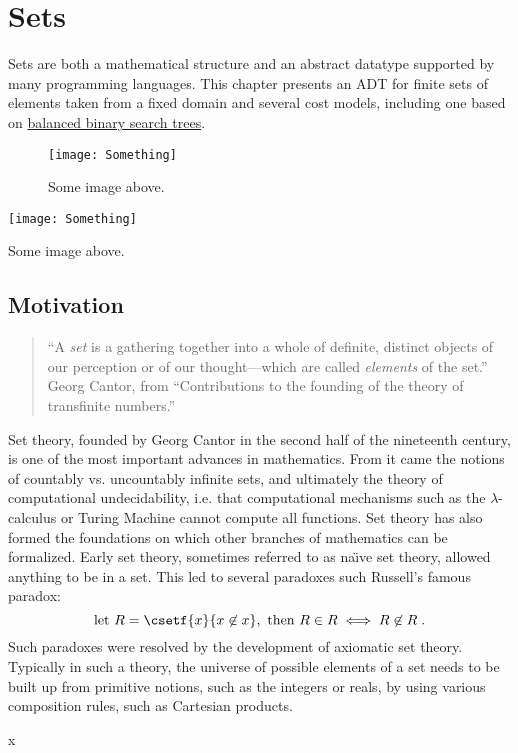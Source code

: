 \chapter{Sets}
\label{XXch:sets}

\begin{preamble}
  Sets are both a mathematical structure and an abstract datatype
  supported by many programming languages.  This chapter presents an ADT for
  finite sets of elements taken from a fixed domain and several cost models, including one based on \href{ch:bst::adt}{balanced binary search trees}.

\end{preamble}


\begin{figure}
\texttt{[image: Something]}
\caption{Some image above.}
\end{figure}


\begin{table}
\texttt{[image: Something]}
\caption{Some image above.}
\end{table}

\section{Motivation}
\label{XXsec:sets::math}


\begin{gram}
\begin{quote}
``A \emph{set} is a gathering together into a whole of definite, distinct
objects of our perception or of our thought---which are called \emph{elements}
of the set.''\\[.1in] Georg Cantor, from ``Contributions to the founding of the theory of transfinite numbers.''
\end{quote}

Set theory, founded by Georg Cantor in the second half of the
nineteenth century, is one of the most important advances in
mathematics.  From it came the notions of countably vs. uncountably
infinite sets, and ultimately the theory of computational
undecidability, i.e. that computational mechanisms such as the
$\lambda$-calculus or Turing Machine cannot compute all functions.
Set theory has also formed the foundations on which other branches of
mathematics can be formalized.  Early set theory, sometimes referred
to as na\"{\i}ve set theory, allowed anything to be in a set.  This
led to several paradoxes such Russell's famous paradox:
  \[\mbox{let } R = \csetf{x}{x \not\in x}, \mbox{ then } R \in R \iff R \not\in R
\;.\] Such paradoxes were resolved by the development of axiomatic set
theory.  Typically in such a theory, the universe of possible elements
of a set needs to be built up from primitive notions, such as the
integers or reals, by using various composition rules, such as
Cartesian products.
\end{gram}
\begin{gram}
x
\end{gram}

